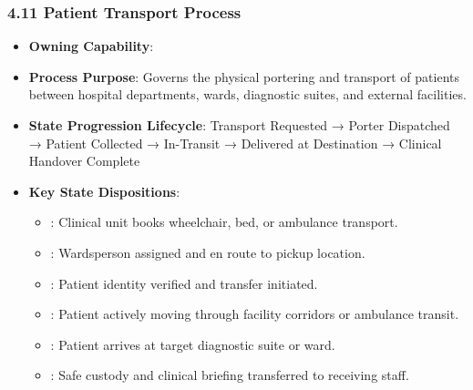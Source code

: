 \par\smallskip
{}\label{rad:processes:233}
\subsubsection*{4.11 Patient Transport Process}
\label{rad:processes:234}

\begin{itemize}

\item 
\textbf{Owning Capability}: \texttt{}



\item 
\textbf{Process Purpose}: Governs the physical portering and transport of patients between hospital departments, wards, diagnostic suites, and external facilities.



\item 
\textbf{State Progression Lifecycle}: Transport Requested → Porter Dispatched → Patient Collected → In-Transit → Delivered at Destination → Clinical Handover Complete



\item 
\textbf{Key State Dispositions}:


\begin{itemize}

\item 
\texttt{}: Clinical unit books wheelchair, bed, or ambulance transport.



\item 
\texttt{}: Wardsperson assigned and en route to pickup location.



\item 
\texttt{}: Patient identity verified and transfer initiated.



\item 
\texttt{}: Patient actively moving through facility corridors or ambulance transit.



\item 
\texttt{}: Patient arrives at target diagnostic suite or ward.



\item 
\texttt{}: Safe custody and clinical briefing transferred to receiving staff.



\end{itemize}


\end{itemize}
\label{rad:processes:246}

